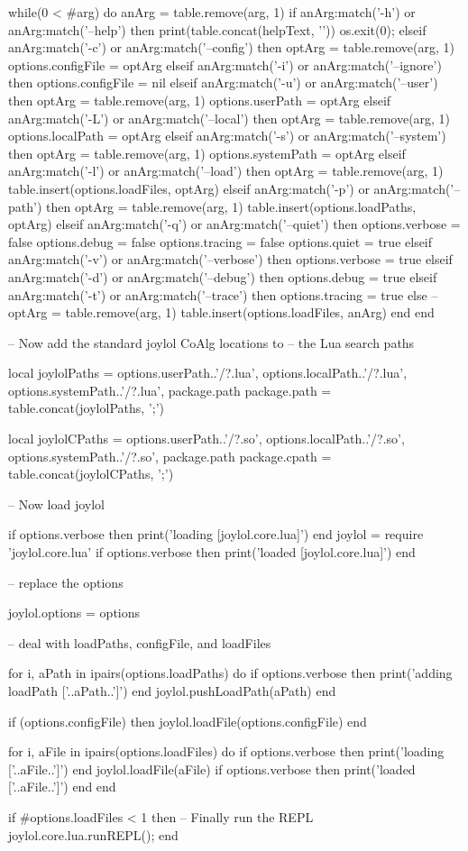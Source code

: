while(0 < #arg) do
  anArg = table.remove(arg, 1)
  if anArg:match('-h') or anArg:match('--help') then
    print(table.concat(helpText, '\n'))
    os.exit(0);
  elseif anArg:match('-c') or anArg:match('--config') then
    optArg = table.remove(arg, 1)
    options.configFile = optArg
  elseif anArg:match('-i') or anArg:match('--ignore') then
    options.configFile = nil
  elseif anArg:match('-u') or anArg:match('--user') then
    optArg = table.remove(arg, 1)
    options.userPath = optArg
  elseif anArg:match('-L') or anArg:match('--local') then
    optArg = table.remove(arg, 1)
    options.localPath = optArg
  elseif anArg:match('-s') or anArg:match('--system') then
    optArg = table.remove(arg, 1)
    options.systemPath = optArg
  elseif anArg:match('-l') or anArg:match('--load') then
    optArg = table.remove(arg, 1)
    table.insert(options.loadFiles, optArg)
  elseif anArg:match('-p') or anArg:match('--path') then
    optArg = table.remove(arg, 1)
    table.insert(options.loadPaths, optArg)
  elseif anArg:match('-q') or anArg:match('--quiet') then
    options.verbose = false
    options.debug   = false
    options.tracing = false
    options.quiet   = true
  elseif anArg:match('-v') or anArg:match('--verbose') then
    options.verbose = true
  elseif anArg:match('-d') or anArg:match('--debug') then
    options.debug = true
  elseif anArg:match('-t') or anArg:match('--trace') then
    options.tracing = true
  else
    --optArg = table.remove(arg, 1)
    table.insert(options.loadFiles, anArg)
  end
end

-- Now add the standard joylol CoAlg locations to
-- the Lua search paths 

local joylolPaths = {
  options.userPath..'/?.lua',
  options.localPath..'/?.lua',
  options.systemPath..'/?.lua',
  package.path
}
package.path = table.concat(joylolPaths, ';')

local joylolCPaths = {
  options.userPath..'/?.so',
  options.localPath..'/?.so',
  options.systemPath..'/?.so',
  package.path
}
package.cpath = table.concat(joylolCPaths, ';')

-- Now load joylol

if options.verbose then print('loading [joylol.core.lua]') end
joylol = require 'joylol.core.lua'
if options.verbose then print('loaded [joylol.core.lua]\n') end

-- replace the options

joylol.options = options

--  deal with loadPaths, configFile, and loadFiles

for i, aPath in ipairs(options.loadPaths) do
  if options.verbose then print('adding loadPath ['..aPath..']\n') end
  joylol.pushLoadPath(aPath)
end

if (options.configFile) then
  joylol.loadFile(options.configFile)
end

for i, aFile in ipairs(options.loadFiles) do
  if options.verbose then print('loading ['..aFile..']\n') end
  joylol.loadFile(aFile)
  if options.verbose then print('loaded ['..aFile..']\n') end
end

if #options.loadFiles < 1 then
  -- Finally run the REPL
  joylol.core.lua.runREPL();
end

\stopLuaCode